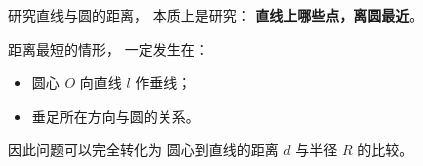 \begin{explanationbox}
研究直线与圆的距离，
本质上是研究：
\textbf{直线上哪些点，离圆最近}。

距离最短的情形，
一定发生在：
\begin{itemize}
  \item 圆心 $O$ 向直线 $l$ 作垂线；
  \item 垂足所在方向与圆的关系。
\end{itemize}

因此问题可以完全转化为
圆心到直线的距离 $d$ 与半径 $R$ 的比较。
\end{explanationbox}
